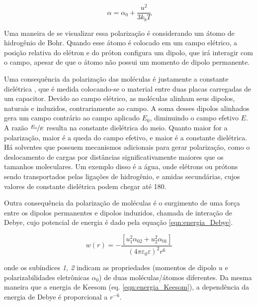 	\begin{equation}
		\alpha = \alpha _ { 0 } + \dfrac{u ^ { 2 }}{ 3 k_b T }
		\label{eqn:debye_langevin}
	\end{equation} 
	
	Uma maneira de se visualizar essa polarização é considerando um átomo de hidrogênio de Bohr. Quando esse átomo é colocado em um campo elétrico, a posição relativa do elétron e do próton configura um dipolo, que irá interagir com o campo, apesar de que o átomo não possui um momento de dipolo permanente.
	
	Uma consequência da polarização das moléculas é justamente a constante dielétrica , que é medida colocando-se o material entre duas placas carregadas de um capacitor. Devido ao campo elétrico, as moléculas alinham seus dipolos, naturais e induzidos, contrariamente ao campo. A soma desses dipolos alinhados gera um campo contrário ao campo aplicado \(E_0\), diminuindo o campo efetivo \(E\). A razão \(\sfrac{E_0}{E}\) resulta na constante dielétrica do meio. Quanto maior for a polarização, maior é a queda do campo efetivo, e maior é a constante dielétrica. Há solventes que possuem mecanismos adicionais para gerar polarização, como o deslocamento de cargas por distâncias significativamente maiores que os tamanhos moleculares. Um exemplo disso é a água, onde elétrons ou prótons sendo transportados pelas ligações de hidrogênio, e amidas secundárias, cujos valores de constante dielétrica podem chegar até 180.

	Outra consequência da polarização de moléculas é o surgimento de uma força entre os dipolos permanentes e dipolos induzidos, chamada de interação de Debye, cujo potencial de energia é dado pela equação \ref{eqn:energia_Debye}.
	
	\begin{equation}
		w ( r ) = - \frac { \left[ u _ { 1 } ^ { 2 } \alpha _ { 02 } + u _ { 2 } ^ { 2 } \alpha _ { 01 } \right] } { \left( 4 \pi \varepsilon _ { 0 } \varepsilon \right) ^ { 2 } r ^ { 6 } }
		\label{eqn:energia_Debye}
	\end{equation}  
	
	\noindent onde os subíndices \emph{1, 2} indicam as propriedades (momentos de dipolo \(u\) e polarizabilidades eletrônicas \(\alpha_0\)) de duas moléculas/átomos diferentes. Da mesma maneira que a energia de Keesom (eq. \ref{eqn:energia_Keesom}), a dependência da energia de Debye é proporcional a \(r^{-6}\). 
	
